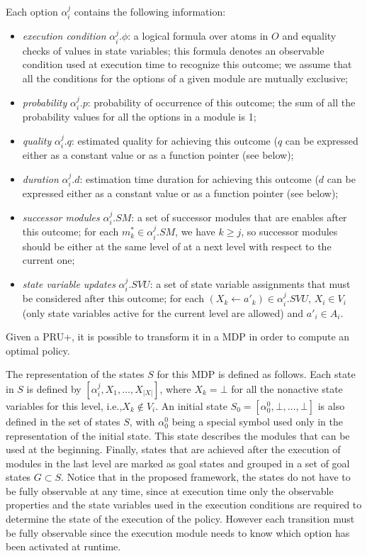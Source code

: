 Each option $\alpha_i^j$ contains the following information:
\begin{itemize}
\item \emph{execution condition} $\alpha_i^j.\phi$: a logical formula over atoms in $O$ and equality checks of values in state variables; this formula denotes an observable condition used at execution time to recognize this outcome; we assume that all the conditions for the options of a given module are mutually exclusive;
\item \emph{probability} $\alpha_i^j.p$: probability of occurrence of this outcome; the sum of all the probability values for all the options in a module is 1;
\item \emph{quality} $\alpha_i^j.q$: estimated quality for achieving this outcome ($q$ can be expressed either as a constant value or as a function pointer (see below);
\item \emph{duration} $\alpha_i^j.d$: estimation time duration for achieving this outcome ($d$ can be expressed either as a constant value or as a function pointer (see below);
\item \emph{successor modules} $\alpha_i^j.SM$: a set of successor modules that are enables after this outcome; for each $m_k^* \in \alpha_i^j.SM$, we have $k \geq j$, so successor modules should be either at the same level of at a next level with respect to the current one;
\item \emph{state variable updates} $\alpha_i^j.SVU$: a set of state variable assignments that must be considered after this outcome; for each $(X_k \leftarrow a'_k) \in \alpha_i^j.SVU$, $X_i \in V_i$ (only state variables active for the current level are allowed) and  $a'_i \in A_i$.
\end{itemize}

Given a PRU+, it is possible to transform it in a MDP in order to compute an optimal policy.

The representation of the states $S$ for this MDP is defined as follows.
Each state in $S$ is defined by $[  \alpha_i^j, X_1, \ldots, X_{|X|} ]$, where
$X_k = \bot$ for all the nonactive state variables for this level, i.e.,$ X_k \notin V_i$.
An initial state $S_0 = [ \alpha_0^0, \bot, \ldots, \bot ]$ is also defined in the set of states $S$, with $\alpha_0^0$ being a special symbol used only in the representation of the initial state. This state describes the modules that can be used at the beginning. Finally, states that are achieved after the execution of modules in the last level are marked as goal states and grouped in a set of goal states $G \subset S$.
Notice that in the proposed framework, the states do not have to be fully observable at any time, since at execution time only the observable properties and the state variables used in the execution conditions are required to determine the state of the execution of the policy. However each transition must be fully observable since the execution module needs to know which option has been activated at runtime.

